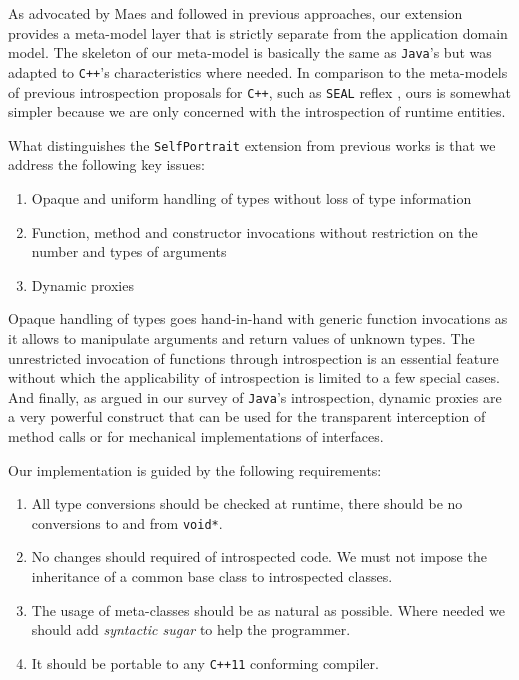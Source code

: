 As advocated by Maes \cite{Maes} and followed in previous approaches, our extension provides a meta-model layer that is strictly
separate from the application domain model. The skeleton of our meta-model is basically the same as \texttt{Java}'s but was adapted to
\texttt{C++}'s characteristics where needed. In comparison to the meta-models of previous introspection proposals for \texttt{C++}, such as \texttt{SEAL} reflex \cite{seal},
ours is somewhat simpler because we are only concerned with the introspection of runtime entities.

What distinguishes the \texttt{SelfPortrait} extension from previous works is that we address the following key issues:

\begin{enumerate}
 \item Opaque and uniform handling of types without loss of type information
 \item Function, method and constructor invocations without restriction on the number and types of arguments
 \item Dynamic proxies
\end{enumerate}

Opaque handling of types goes hand-in-hand with generic function invocations as it allows to manipulate arguments and return
values of unknown types. The unrestricted invocation of functions through introspection is an essential feature without which
the applicability of introspection is limited to a few special cases. And finally, as argued in our survey of \texttt{Java}'s introspection,
dynamic proxies are a very powerful construct that can be used for the transparent interception of method calls or for mechanical
implementations of interfaces. 

Our implementation is guided by the following requirements:

\begin{enumerate}
 \item All type conversions should be checked at runtime, there should be no conversions to and from \texttt{void*}.
 \item No changes should required of introspected code. We must not impose the inheritance of a common base class to introspected classes.
 \item The usage of meta-classes should be as natural as possible. Where needed we should add \emph{syntactic sugar} to help the programmer.
 \item It should be portable to any \texttt{C++11} conforming compiler.
\end{enumerate}

